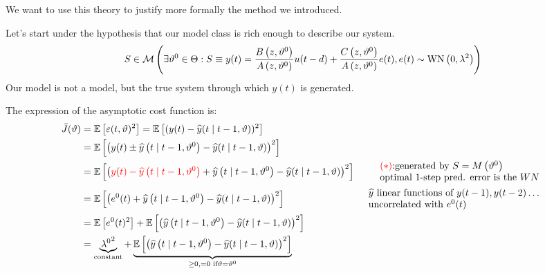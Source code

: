 We want to use this theory to justify more formally the method we introduced.

Let's start under the hypothesis that our model class is rich enough to describe our system.
\begin{equation*}
S\in \mathcal{M} \left(\exists \vartheta ^{0} \in \Theta :S\equiv y(t) =\frac{B\left(z,\vartheta ^{0}\right)}{A\left(z,\vartheta ^{0}\right)} u(t-d) +\frac{C\left(z,\vartheta ^{0}\right)}{A\left(z,\vartheta ^{0}\right)} e(t) ,e(t) \sim \operatorname{WN} \left(0,\lambda ^{2}\right)\right)
\end{equation*}
Our model is not a model, but the true system through which $ y(t)$ is generated.

The expression of the asymptotic cost function is:
\begin{equation*}
\begin{aligned}
\bar{J}(\theta) & =\mathbb{E}\left[ \varepsilon (t,\theta)^{2}\right] =\mathbb{E}\left[(y(t) -\hat{y}(t\mid t-1,\theta))^{2}\right] & \\
 & =\mathbb{E}\left[\left(y(t) \pm \hat{y}\left(t\mid t-1,\theta ^{0}\right) -\hat{y}(t\mid t-1,\theta)\right)^{2}\right] & \\
 & =\mathbb{E}\left[\left(\textcolor[rgb]{1,0,0}{y(t) -\hat{y}\left(t\mid t-1,\theta^{0}\right)} +\hat{y}\left(t\mid t-1,\theta ^{0}\right) -\hat{y}(t\mid t-1,\theta)\right)^{2}\right] &  \begin{array}{l}
\textcolor[rgb]{1,0,0}{(*)}\text{:generated by } S=M\left(\theta ^{0}\right)\\
\text{optimal 1-step pred. error is the } WN
\end{array}\\
 & =\mathbb{E}\left[\left(e^{0}(t) +\hat{y}\left(t\mid t-1,\theta ^{0}\right) -\hat{y}(t\mid t-1,\theta)\right)^{2}\right] &  \begin{array}{l}
\hat{y} \text{ linear functions of } y(t-1),y(t-2) \ldots\\
\text{uncorrelated with } e^{0}(t)
\end{array}\\
 & =\mathbb{E}\left[ e^{0}(t)^{2}\right] +\mathbb{E}\left[\left(\hat{y}\left(t\mid t-1,\theta ^{0}\right) -\hat{y}(t\mid t-1,\theta)\right)^{2}\right] & \\
 & =\underbrace{\lambda {^{0}}^{2}}_{\text{constant}} +\underbrace{\mathbb{E}\left[\left(\hat{y}\left(t\mid t-1,\theta ^{0}\right) -\hat{y}(t\mid t-1,\theta)\right)^{2}\right]}_{\geq 0,=0\text{ if} \theta =\theta ^{0}} & 
\end{aligned}
\end{equation*}

